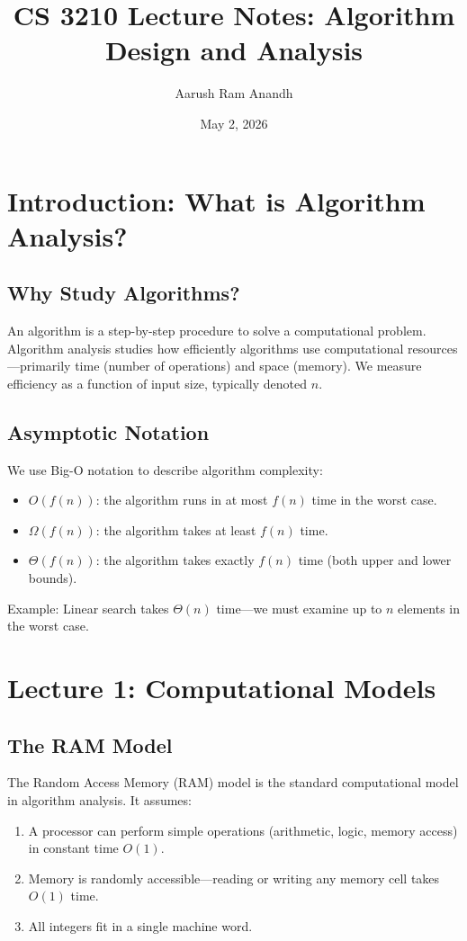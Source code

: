 \documentclass[11pt]{article}
\title{CS 3210 Lecture Notes: Algorithm Design and Analysis}
\author{Aarush Ram Anandh}
\date{May 2, 2026}
\begin{document}
\maketitle
\tableofcontents
\newpage

\section{Introduction: What is Algorithm Analysis?}

\subsection*{Why Study Algorithms?}
An algorithm is a step-by-step procedure to solve a computational problem. Algorithm analysis studies how efficiently algorithms use computational resources---primarily time (number of operations) and space (memory). We measure efficiency as a function of input size, typically denoted $n$.

\subsection*{Asymptotic Notation}
We use Big-O notation to describe algorithm complexity:
\begin{itemize}
\item $O(f(n))$: the algorithm runs in at most $f(n)$ time in the worst case.
\item $\Omega(f(n))$: the algorithm takes at least $f(n)$ time.
\item $\Theta(f(n))$: the algorithm takes exactly $f(n)$ time (both upper and lower bounds).
\end{itemize}

Example: Linear search takes $\Theta(n)$ time—we must examine up to $n$ elements in the worst case.

\section{Lecture 1: Computational Models}

\subsection*{The RAM Model}
The Random Access Memory (RAM) model is the standard computational model in algorithm analysis. It assumes:
\begin{enumerate}
\item A processor can perform simple operations (arithmetic, logic, memory access) in constant time $O(1)$.
\item Memory is randomly accessible—reading or writing any memory cell takes $O(1)$ time.
\item All integers fit in a single machine word.
\end{enumerate}
\end{document}
